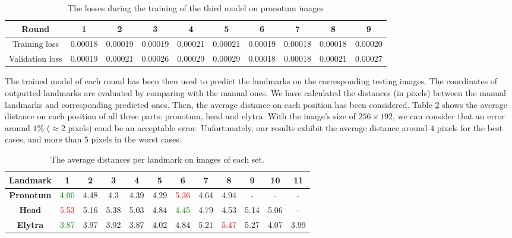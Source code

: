 \documentclass[review]{elsarticle}
\begin{document}
\begin{table}[h!]
	\centering
	\begin{tabular}{| c | c | c | c | c | c | c | c | c | c |}
	\hline
	Round & 1 & 2 & 3 & 4 & 5 & 6 & 7 & 8 & 9 \\ \hline
Training loss & 0.00018 & 0.00019 & 0.00019 & 0.00021 & 0.00021 & 0.00019 & 0.00018 & 0.00018 & 0.00020 \\ \hline
Validation loss & 0.00019 & 0.00021 & 0.00026 & 0.00029 & 0.00029 & 0.00018 & 0.00018 & 0.00021 & 0.00027 \\ \hline
	\end{tabular}
	\caption{The losses during the training of the third model on pronotum images}
	\label{tbltrainingloss}
\end{table}

The trained model of each round has been then used to predict the landmarks on the corresponding testing images. The coordinates of outputted landmarks are evaluated by comparing with the manual ones. We have calculated the distances (in pixels) between the manual landmarks and corresponding predicted ones. Then, the average distance on each position has been considered. Table \ref{tblavgpronotum} shows the average distance on each position of all three parts: pronotum, head and elytra. With the image's size of $256 \times 192$, we can consider that an error around $1\%$ ($\approx 2$ pixels) coud be an acceptable error. Unfortunately, our results exhibit the average distance around $4$ pixels for the best cases, and more than $5$ pixels in the worst cases.

\begin{table}[h!]
	\centering	
	\begin{tabular}{|c|c|c|c|c|c|c|c|c|c|c|c|}
		\hline
		\textbf{Landmark} & 1 & 2 & 3 & 4 & 5 & 6 & 7 & 8 & 9 & 10 & 11 \\ \hline
		\textbf{Pronotum} & \textcolor{green}{4.00} & 4.48 & 4.3 & 4.39 & 4.29 & \textcolor{red}{5.36} & 4.64 & 4.94 & - & - & - \\ \hline
		\textbf{Head} & \textcolor{red}{5.53} & 5.16 & 5.38 & 5.03 & 4.84 & \textcolor{green}{4.45} & 4.79 & 4.53 & 5.14 & 5.06 & - \\ \hline
		\textbf{Elytra} & \textcolor{green}{3.87} & 3.97 & 3.92 & 3.87 & 4.02 & 4.84 & 5.21 & \textcolor{red}{5.47} & 5.27 & 4.07 & 3.99 \\ \hline
	\end{tabular}
	\caption{The average distances per landmark on images of each set.}
	\label{tblavgpronotum}
\end{table}
\end{document}
